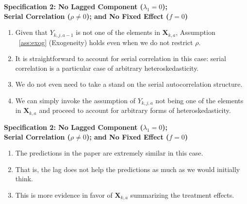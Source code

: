 \documentclass[static]{JJH-Beamer}
\begin{document}
\begin{frame}

\textbf{Specification 2: No Lagged Component ($\lambda_{1} = 0$);\\ Serial Correlation ($\rho \neq 0$); and No Fixed Effect ($f = 0$)}

\begin{enumerate}
\item Given that $Y_{k,j,a-1}$ is not one of the elements in $\bm{X}_{k,a}$, Assumption ~\ref{ass:exog} (Exogeneity) holds even when we do not restrict $\rho$.
\item It is straightforward to account for serial correlation in this case: serial correlation is a particular case of arbitrary heteroskedasticity.
\item We do not even need to take a stand on the serial autocorrelation structure.
\item We can simply invoke the assumption of $Y_{k,j,a}$ not being one of the elements in $\bm{X}_{k,a}$ and proceed to account for arbitrary forms of heteroskedasticity.
\end{enumerate}

\end{frame}

\begin{frame}

\textbf{Specification 2: No Lagged Component ($\lambda_{1} = 0$);\\ Serial Correlation ($\rho \neq 0$); and No Fixed Effect ($f = 0$)}

\begin{enumerate}\addtocounter{enumi}{4}
\item The predictions in the paper are extremely similar in this case.
\item That is, the lag does not help the predictions as much as we would initially think.
\item This is more evidence in favor of $\bm{X}_{k,a}$ summarizing the treatment effects.
\end{enumerate}

\end{frame}
\end{document}
